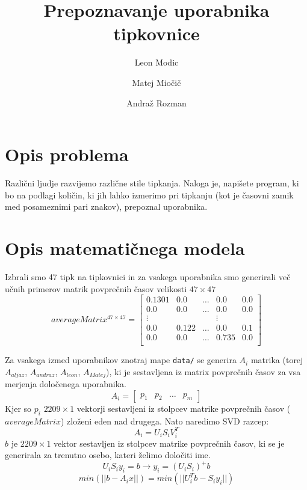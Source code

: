 \documentclass[12pt]{article}
\begin{document}
\title{\textbf{Prepoznavanje uporabnika tipkovnice}}
\author{
  Leon Modic\\
  \and
  Matej Miočič\\
  \and
  Andraž Rozman\\
}
\maketitle

\section{Opis problema}
Različni ljudje razvijemo različne stile tipkanja. Naloga je, napišete program,
ki bo na podlagi količin, ki jih lahko izmerimo pri tipkanju (kot je časovni
zamik med posameznimi pari znakov), prepoznal uporabnika.
\section{Opis matematičnega modela}
Izbrali smo 47 tipk na tipkovnici in za vsakega uporabnika smo generirali več učnih
primerov matrik povprečnih časov velikosti $47 \times 47$
\[
  averageMatrix^{47 \times 47}=
  \begin{bmatrix}
    0.1301 & 0.0 & \dots & 0.0 & 0.0\\
    0.0 & 0.0 & \dots & 0.0 & 0.0\\
    \vdots & & & \vdots\\
    0.0 & 0.122 & \dots & 0.0 & 0.1\\
    0.0 & 0.0 & \dots & 0.735 & 0.0\\
  \end{bmatrix}
\]

Za vsakega izmed uporabnikov znotraj mape \texttt{data/} se generira $A_i$ matrika
(torej $A_{aljaz}$, $A_{andraz}$, $A_{leon}$, $A_{Matej}$), ki je sestavljena iz matrix povprečnih
časov za vsa merjenja določenega uporabnika.
\[
  A_i = \begin{bmatrix}
    p_1 & p_2 & \dots & p_m
  \end{bmatrix}
\]
Kjer so $p_i$ $2209 \times 1$ vektorji sestavljeni iz stolpcev matrike povprečnih časov ($averageMatrix$) zloženi
eden nad drugega. Nato naredimo SVD razcep:
$$A_i=U_iS_iV_i^T$$
$b$ je $2209 \times 1$ vektor sestavljen iz stolpcev matrike povprečnih časov, ki se je generirala za trenutno osebo, kateri želimo
določiti ime.
$$U_iS_iy_i = b \rightarrow y_i = (U_iS_i)^+b$$
$$min(||b-A_ix||) = min(||U_i^Tb-S_iy_i||)$$
\end{document}
